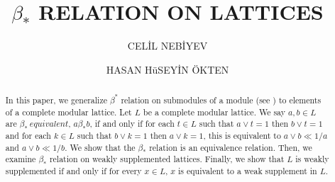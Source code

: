 \documentclass[11pt,reqno]{amsart} %
\theoremstyle{plain}
\theoremstyle{definition}
\theoremstyle{remark}
\numberwithin{equation}{section}
\begin{document}
\title[$ \beta_* $ RELATION ON LATTICES]{$ \beta_* $ RELATION ON LATTICES}
\begin{abstract}
  In this paper, we generalize $ \beta^* $ relation on submodules of a module (see \cite{nebiyev}) to elements of a complete modular lattice. Let $ L $ be 
  a complete modular lattice. We say $ a,b \in L $ are $ \beta_* \ equivalent $, $ a \beta_* b $, if and only if 
  for each $ t \in L $ such that $ a \vee t = 1 $ then $ b \vee t = 1 $ and for each $ k \in L $ such that $ b \vee k = 1 $ then $ a \vee k = 1 $, this is 
  equivalent to $ a \vee b \ll 1/a $ and $ a \vee b \ll 1/b $. 
  We show that the $ \beta_* $ relation is an equivalence relation. Then, we examine $ \beta_* $ relation on weakly supplemented lattices. 
  Finally, we show that $ L $ is weakly supplemented if and only if for every $ x \in L $, $ x $ is equivalent to a weak supplement in $ L $. 
\end{abstract}

\author{CEL\.{I}L NEB\.{I}YEV}
\address{Department of Mathematics, Ondokuz Mayis University \\ Kurupelit-Atakum-Samsun, Turkey}
\author{HASAN H\"{u}SEY\.{I}N \"{O}KTEN
}
\address{Technical Sciences Vocational School, Amasya University \\ Amasya, Turkey}



\maketitle
\end{document}
